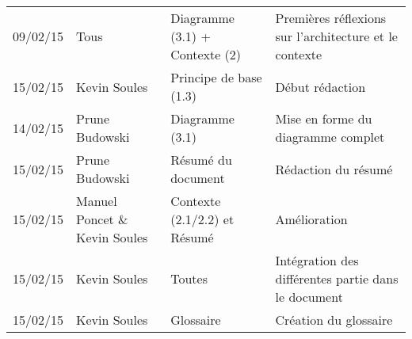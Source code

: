 \small
\begin{tabular}{|p{1.5cm}| >{\raggedright}p{2.9cm}| >{\raggedright}p{3.2cm}|p{7.2cm}|}
  \hline
  \rowcolor{Gainsboro} \color{Navy}{\bfseries Date}  & \color{Navy}{\bfseries Auteur} & \color{Navy}{\bfseries Section(s)}  &\color{Navy}{\bfseries Commentaires} \\
  \hline
  09/02/15 & Tous & Diagramme (3.1) + Contexte (2) & Premières réflexions sur l'architecture et le contexte\\
  \hline
  15/02/15 & Kevin Soules & Principe de base (1.3)  & Début rédaction\\
  \hline
  14/02/15 & Prune Budowski & Diagramme (3.1) & Mise en forme du diagramme complet\\
  \hline
  15/02/15 & Prune Budowski & Résumé du document & Rédaction du résumé\\
  \hline
  15/02/15 & Manuel Poncet \& Kevin Soules & Contexte (2.1/2.2) et Résumé & Amélioration\\
  \hline
  15/02/15 & Kevin Soules & Toutes & Intégration des différentes partie dans le document\\
  \hline
  15/02/15 & Kevin Soules & Glossaire & Création du glossaire\\
  \hline
\end{tabular}
\normalsize
